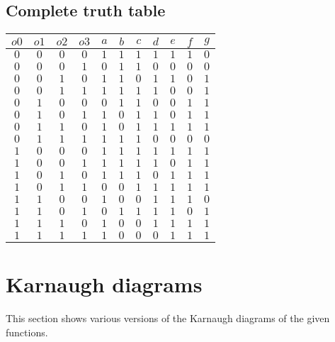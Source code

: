 \documentclass [15pt,a4paper,twoside]{article}
\begin{document}
\subsection{Complete truth table}
\begin{center}
\begin{tabular}{cccc|ccccccc}
$o0$&$o1$&$o2$&$o3$&$a$&$b$&$c$&$d$&$e$&$f$&$g$\\
\hline
$0$&$0$&$0$&$0$&$1$&$1$&$1$&$1$&$1$&$1$&$0$\\
$0$&$0$&$0$&$1$&$0$&$1$&$1$&$0$&$0$&$0$&$0$\\
$0$&$0$&$1$&$0$&$1$&$1$&$0$&$1$&$1$&$0$&$1$\\
$0$&$0$&$1$&$1$&$1$&$1$&$1$&$1$&$0$&$0$&$1$\\
$0$&$1$&$0$&$0$&$0$&$1$&$1$&$0$&$0$&$1$&$1$\\
$0$&$1$&$0$&$1$&$1$&$0$&$1$&$1$&$0$&$1$&$1$\\
$0$&$1$&$1$&$0$&$1$&$0$&$1$&$1$&$1$&$1$&$1$\\
$0$&$1$&$1$&$1$&$1$&$1$&$1$&$0$&$0$&$0$&$0$\\
$1$&$0$&$0$&$0$&$1$&$1$&$1$&$1$&$1$&$1$&$1$\\
$1$&$0$&$0$&$1$&$1$&$1$&$1$&$1$&$0$&$1$&$1$\\
$1$&$0$&$1$&$0$&$1$&$1$&$1$&$0$&$1$&$1$&$1$\\
$1$&$0$&$1$&$1$&$0$&$0$&$1$&$1$&$1$&$1$&$1$\\
$1$&$1$&$0$&$0$&$1$&$0$&$0$&$1$&$1$&$1$&$0$\\
$1$&$1$&$0$&$1$&$0$&$1$&$1$&$1$&$1$&$0$&$1$\\
$1$&$1$&$1$&$0$&$1$&$0$&$0$&$1$&$1$&$1$&$1$\\
$1$&$1$&$1$&$1$&$1$&$0$&$0$&$0$&$1$&$1$&$1$\\

\end{tabular}
\end{center}
\section{Karnaugh diagrams}
This section shows various versions of the Karnaugh diagrams of the given functions.
\end{document}
